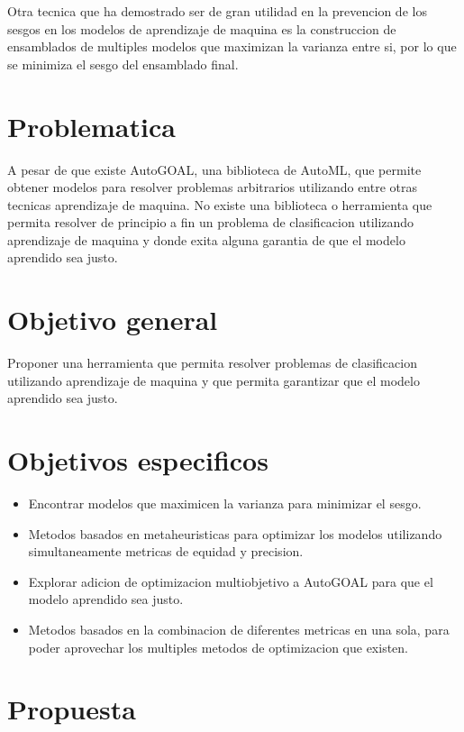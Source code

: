 \documentclass[runningheads,a4paper]{llncs}
\begin{document}
	Otra tecnica que ha demostrado ser de gran utilidad en la prevencion de los sesgos en los modelos de aprendizaje de maquina es la construccion de ensamblados de multiples modelos que maximizan la varianza entre si, por lo que se minimiza el sesgo del ensamblado final.
	
	\section*{Problematica}
	
	A pesar de que existe AutoGOAL, una biblioteca de AutoML, que permite obtener modelos para resolver problemas arbitrarios utilizando entre otras tecnicas aprendizaje de maquina. No existe una biblioteca o herramienta que permita resolver de principio a fin un problema de clasificacion utilizando aprendizaje de maquina y donde exita alguna garantia de que el modelo aprendido sea justo.
	
	\section*{Objetivo general}
	
	Proponer una herramienta que permita resolver problemas de clasificacion utilizando aprendizaje de maquina y que permita garantizar que el modelo aprendido sea justo.
	
	\section*{Objetivos especificos}
	
	\begin{itemize}
		\item Encontrar modelos que maximicen la varianza para minimizar el sesgo.
		\item Metodos basados en metaheuristicas para optimizar los modelos utilizando simultaneamente metricas de equidad y precision.
		\item Explorar adicion de optimizacion multiobjetivo a AutoGOAL para que el modelo aprendido sea justo.
		\item Metodos basados en la combinacion de diferentes metricas en una sola, para poder aprovechar los multiples metodos de optimizacion que existen.
	\end{itemize}
	
	\section*{Propuesta}\label{chapter:proposal}
	
\end{document}
